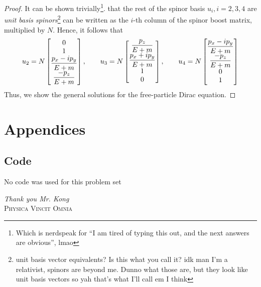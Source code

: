\documentclass[12pt,a4paper]{article}
\begin{document}
\begin{solution_pset}
\begin{proof}
			It can be shown trivially\footnote{Which is nerdspeak for ``I am tired of typing this out, and the next answers are obvious'', lmao}.
			that the rest of the spinor basis $u_i, i=2,3,4$ are \textit{unit basis spinors}\footnote{unit basis vector equivalents? Is this what you call it? idk man I'm a relativist, spinors are beyond me. Dunno what those are, but they look like unit basis vectors so yah that's what I'll call em I think} can be written as the $i$-th column 
			of the spinor boost matrix, multiplied by $N$. Hence, it follows that
			\begin{equation}
				\label{eq:sols}
				u_2
				=
				N
				\bmqty{
					0\\1\\
					\dfrac{p_x - ip_y}{E+m} 
					\\
					\dfrac{-p_z}{E+m} 
				},\qquad  
				u_3
				=
				N
				\bmqty{
					\dfrac{p_z}{E+m} 
					\\
					\dfrac{p_x + ip_y}{E+m} 
					\\
					1\\0
				},\qquad  
				u_4
				=
				N
				\bmqty{
					\dfrac{p_x - ip_y}{E+m} 
					\\
					\dfrac{-p_z}{E+m} 
					\\
					0\\1
				}
			\end{equation}
			Thus, we show the general solutions for the free-particle Dirac equation.
		\end{proof}
	\end{solution_pset}
	\newpage

	 
	 
	\section*{Appendices}
		\label{appendix}
	
		\subsection*{Code} 
		No code was used for this problem set
	\vfill
	\begin{center}
		\textit{Thank you Mr. Kong}\\
		\vspace{1cm}
		{\large
		\textsc{Physica Vincit Omnia}
		}
	\end{center}
\end{document}
